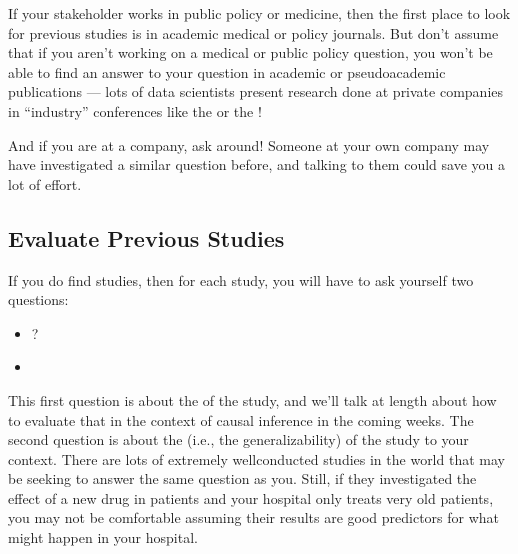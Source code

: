 \documentclass[letterpaper,10pt,english]{jupyterBook}
\begin{document}
\sphinxAtStartPar
If your stakeholder works in public policy or medicine, then the first place to look for previous studies is in academic medical or policy journals. But don’t assume that if you aren’t working on a medical or public policy question, you won’t be able to find an answer to your question in academic or pseudo\sphinxhyphen{}academic publications — lots of data scientists present research done at private companies in “industry” conferences like the  or the !

\sphinxAtStartPar
And if you are at a company, ask around! Someone at your own company may have investigated a similar question before, and talking to them could save you a lot of effort.


\subsection{Evaluate Previous Studies}
\label{\detokenize{30_questions/35_using_causal_questions:evaluate-previous-studies}}
\sphinxAtStartPar
If you do find studies, then for each study, you will have to ask yourself two questions:
\begin{itemize}
\item {} 
\sphinxAtStartPar
{}?

\item {} 
\sphinxAtStartPar
{}

\end{itemize}

\sphinxAtStartPar
This first question is about the  of the study, and we’ll talk at length about how to evaluate that in the context of causal inference in the coming weeks. The second question is about the  (i.e., the generalizability) of the study to your context. There are lots of extremely well\sphinxhyphen{}conducted studies in the world that may be seeking to answer the same question as you. Still, if they investigated the effect of a new drug in  patients and your hospital only treats very old patients, you may not be comfortable assuming their results are good predictors for what might happen in your hospital.
\end{document}
